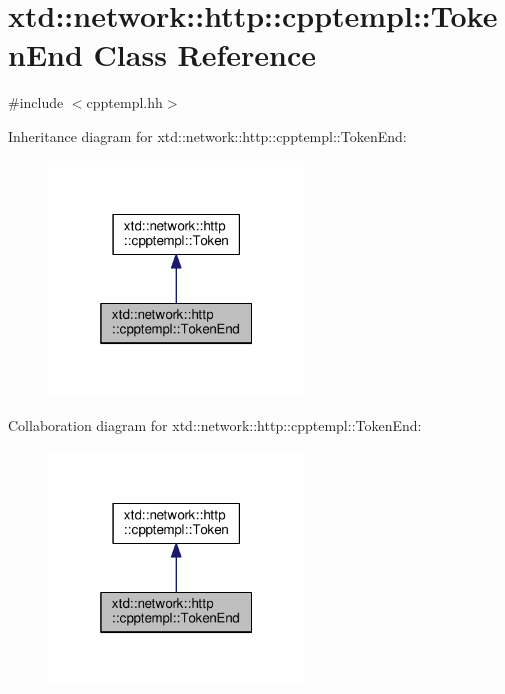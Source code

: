 \hypertarget{classxtd_1_1network_1_1http_1_1cpptempl_1_1TokenEnd}{}\section{xtd\+:\+:network\+:\+:http\+:\+:cpptempl\+:\+:Token\+End Class Reference}
\label{classxtd_1_1network_1_1http_1_1cpptempl_1_1TokenEnd}


{\ttfamily \#include $<$cpptempl.\+hh$>$}



Inheritance diagram for xtd\+:\+:network\+:\+:http\+:\+:cpptempl\+:\+:Token\+End\+:
\nopagebreak
\begin{figure}[H]
\begin{center}
\leavevmode
\includegraphics[width=193pt]{classxtd_1_1network_1_1http_1_1cpptempl_1_1TokenEnd__inherit__graph}
\end{center}
\end{figure}


Collaboration diagram for xtd\+:\+:network\+:\+:http\+:\+:cpptempl\+:\+:Token\+End\+:
\nopagebreak
\begin{figure}[H]
\begin{center}
\leavevmode
\includegraphics[width=193pt]{classxtd_1_1network_1_1http_1_1cpptempl_1_1TokenEnd__coll__graph}
\end{center}
\end{figure}
